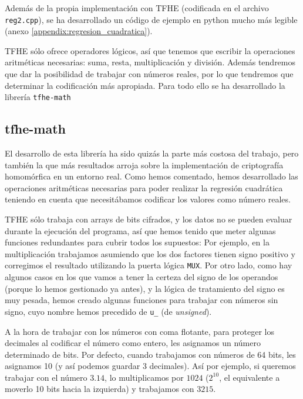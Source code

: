 Además de la propia implementación con TFHE (codificada en el archivo \verb|reg2.cpp|), se ha desarrollado un código de ejemplo en python mucho más legible (anexo \ref{appendix:regresion_cuadratica}).

TFHE sólo ofrece operadores lógicos, así que tenemos que escribir la operaciones aritméticas necesarias: suma, resta, multiplicación y división. Además tendremos que dar la posibilidad de trabajar con números reales, por lo que tendremos que determinar la codificación más apropiada. Para todo ello se ha desarrollado la librería \texttt{tfhe-math}

\subsection{tfhe-math}

El desarrollo de esta librería ha sido quizás la parte más costosa del trabajo, pero también la que más resultados arroja sobre la implementación de criptografía homomórfica en un entorno real. Como hemos comentado, hemos desarrollado las operaciones aritméticas necesarias para poder realizar la regresión cuadrática teniendo en cuenta que necesitábamos codificar los valores como número reales.

TFHE sólo trabaja con arrays de bits cifrados, y los datos no se pueden evaluar durante la ejecución del programa, así que hemos tenido que meter algunas funciones redundantes para cubrir todos los supuestos: Por ejemplo, en la multiplicación trabajamos asumiendo que los dos factores tienen signo positivo y corregimos el resultado utilizando la puerta lógica \texttt{MUX}. Por otro lado, como hay algunos casos en los que vamos a tener la certeza del signo de los operandos (porque lo hemos gestionado ya antes), y la lógica de tratamiento del signo es muy pesada, hemos creado algunas funciones para trabajar con números sin signo, cuyo nombre hemos precedido de \texttt{u\_} (de \textit{unsigned}).

A la hora de trabajar con los números con coma flotante, para proteger los decimales al codificar el número como entero, les asignamos un número determinado de bits. Por defecto, cuando trabajamos con números de 64 bits, les asignamos 10 (y así podemos guardar 3 decimales). Así por ejemplo, si queremos trabajar con el número $ 3.14 $, lo multiplicamos por $ 1024 $ ($ 2^{10} $, el equivalente a moverlo 10 bits hacia la izquierda) y trabajamos con $ 3215 $.


